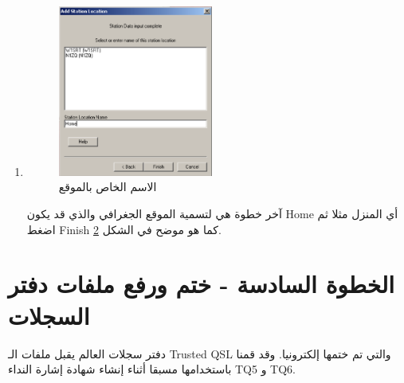 \documentclass[a4paper,12pt]{article}
\begin{document}
\begin{enumerate}
\begin{figure}[!hbtp]
			\caption{اختر الولاية والمقاطعة الأمريكية التي تُقيم بها إن كنت تحمل إشارة نداء أمريكية}
			\label{fig:LocationState}
			\end{figure}
			صاحب إشاراة النداء الأمريكية بإمكانه اختيار الولاية والمقاطعة التي يُقيم بها من القائمة المُنسَدلة كما هو موضح في الشكل \ref{fig:LocationState}.
		\item
			\begin{figure}[!hbtp]
			\centering
			\includegraphics[width=0.48\textwidth]{locationname.eps}
			\caption{الاسم الخاص بالموقع}
			\label{fig:LocationName}
			\end{figure}
			  آخر خطوة هي لتسمية الموقع الجغرافي والذي قد يكون \textenglish{Home} أي المنزل مثلا
		  ثم اضغط \textenglish{Finish} كما هو موضح في الشكل \ref{fig:LocationName}.
	\end{enumerate}


\vspace{24pt}
\begin{center}
	\color{slategray2}
{\Huge\hrulefill\hspace{0.2cm} \floweroneright\floweroneleft \hspace{0.2cm} \hrulefill}
\end{center}
\newpage


\section{الخطوة السادسة - ختم ورفع ملفات دفتر السجلات}

دفتر سجلات العالم يقبل ملفات الـ \textenglish{Trusted QSL} والتي تم ختمها إلكترونيا.
وقد قمنا باستخدامها مسبقا أثناء إنشاء شهادة إشارة النداء \textenglish{TQ5} و \textenglish{TQ6}.
\end{document}

